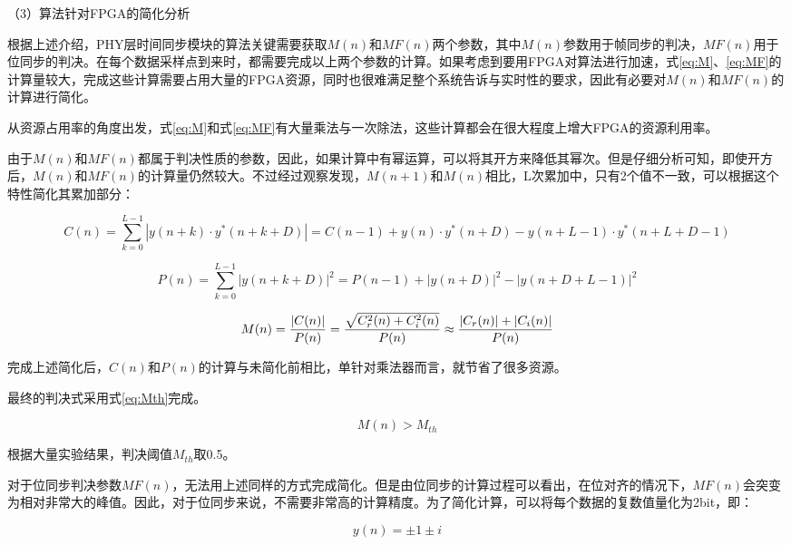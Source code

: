 \documentclass[titlepage]{article}
\numberwithin{figure}{section}
\numberwithin{equation}{section}
\begin{document}
（3）算法针对FPGA的简化分析

根据上述介绍，PHY层时间同步模块的算法关键需要获取$M(n)$和$MF(n)$两个参数，其中$M(n)$参数用于帧同步的判决，$MF(n)$用于位同步的判决。在每个数据采样点到来时，都需要完成以上两个参数的计算。如果考虑到要用FPGA对算法进行加速，式\ref{eq:M}、\ref{eq:MF}的计算量较大，完成这些计算需要占用大量的FPGA资源，同时也很难满足整个系统告诉与实时性的要求，因此有必要对$M(n)$和$MF(n)$的计算进行简化。

从资源占用率的角度出发，式\ref{eq:M}和式\ref{eq:MF}有大量乘法与一次除法，这些计算都会在很大程度上增大FPGA的资源利用率。

由于$M(n)$和$MF(n)$都属于判决性质的参数，因此，如果计算中有幂运算，可以将其开方来降低其幂次。但是仔细分析可知，即使开方后，$M(n)$和$MF(n)$的计算量仍然较大。不过经过观察发现，$M(n+1)$和$M(n)$相比，L次累加中，只有2个值不一致，可以根据这个特性简化其累加部分：

\begin{equation}\label{eq:C-v01}
C(n)=\sum_{k=0}^{L-1}|y(n+k)\cdot y^{*}(n+k+D)|=C(n-1)+y(n)\cdot y^{*}(n+D)-y(n+L-1)\cdot y^{*}(n+L+D-1)
\end{equation}

\begin{equation}\label{eq:P-v01}
P(n)=\sum_{k=0}^{L-1}{|y(n+k+D)|}^{2}=P(n-1)+{|y(n+D)|}^{2}-{|y(n+D+L-1)|}^{2}
\end{equation}

\begin{equation}\label{eq:M-v01}
M(n)={|C(n)|\over P(n)}={\sqrt{C_{r}^{2}(n)+C_{i}^{2}(n)}\over P(n)} \approx {{|C_{r}(n)|+|C_{i}(n)|} \over P(n)}
\end{equation}

完成上述简化后，$C(n)$和$P(n)$的计算与未简化前相比，单针对乘法器而言，就节省了很多资源。

最终的判决式采用式\ref{eq:Mth}完成。

\begin{equation}\label{eq:Mth}
M(n)>M_{th}
\end{equation}

根据大量实验结果，判决阈值$M_{th}$取0.5。

对于位同步判决参数$MF(n)$，无法用上述同样的方式完成简化。但是由位同步的计算过程可以看出，在位对齐的情况下，$MF(n)$会突变为相对非常大的峰值。因此，对于位同步来说，不需要非常高的计算精度。为了简化计算，可以将每个数据的复数值量化为2bit，即：

\begin{equation}\label{eq:2bit}
y(n)=\pm{1} \pm{i}
\end{equation}
\end{document}
